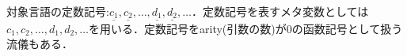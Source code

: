 \documentclass{ltjsarticle}
\theoremstyle{mystyle1}
\theoremstyle{mystyle3}
\theoremstyle{mystyle2}
\begin{document}
対象言語の定数記号:$\underline{c_1},\underline{c_2},\ldots,\underline{d_1},\underline{d_2},\ldots$．定数記号を表すメタ変数としては$c_1,c_2,\ldots,d_1,d_2,\ldots$を用いる．定数記号をarity(引数の数)が0の函数記号として扱う流儀もある．

\begin{comment}
■函数記号
2311
F: 函数記号(function symbol)の集合． arity: F → N \ {0} が定義され，引数の数を表すと する． 対象言語の函数記号:fi, f2, ... 91, 92, ... h1, h2, ...． 函数記号を表すメタ変数としては f,g,h, fi, fe, .... g1, 92, ..., h1, h2, ... を用いる． F = {f/2,g/1}などと表 記して，arity(f) = 2, arity(g) = 1を表すことに
する．
述語記号
232
P: 述語記号(predicate symbol) の集合．空でないと する．arity: P → N が定義されているとする． 対象言語の述語記号:p1,p2, ..., 41,42, ..., r1, 72, ...．述 語記号を表すメタ変数として p, g, r, ..., p1,p2, ..., 91, 92, ... を用いる．Fの場合と同 様にしてarity を表すことにする．
上記3種類の定数・函数・述語記号は，述語記号が空集 合でないという条件が付いている以外，一般には追加 条件はない．述語記号が空集合だと，後で定義する論 理式の集合が空集合となってしまうため，意味がない．
233
但し一階述語論理で取り扱える一般の数学の場合，こ れら3種類の記号は通常有限集合とする場合がほとん どである．無限集合の場合も考えるのは，そのように 一般化してもそれほど問題がないことと，理論展開上 必要な場合が出てくるのに備えてのことである．
■補助記号 (,) などの補助的に用いる記号．
■一階述語論理の言語
234
V, K, F, Pがすべて定まると一階述語論理の構成要素 の記号やそれらの列あるいは木がすべて定まるので， L = (V, K, F, P) で一階述語論理の言語を表すことに する．逆に，LのV, K, F, Pをそれぞれ VL, KL, FL, PL と書いて，言語Lの変数記号，定数記 号，函数記号，述語記号の集合を表すことにする．以 下の項，原子論理式，論理式の集合は，組 Lが定まる と決まるので，それぞれ添え字Lを付けている．
Phone
www
項
235
以下のように帰納的に定義される集合TTL の元を項 (term) という． (1) 変数記号と定数記号はTTLの元である． (2) ti, ... twをTTLの元とし, f を arity nの函数記号
とするとき，f(t1,..,tn) も TTLの元である． S, t, S1, S2, ..., t1, te, ...を項のメタ変数として用いる． 函数記号を四則演算の+や-，・のように演算子として 項を表記する場合がある．演算子の優先順位は，通常 は単項の方が他よりも優先順位が高いとする．
■原子論理式
236
t1,.., thを項とし, pを arity が n の述語記号とすると き，p(t1,..,tn)は原子論理式(atomic formula) の集 合 AALの元である． 原子論理式も，述語記号を演算子として表記する場合
がある．例えば等号=/2は二項演算子として表記する 場合が多い．
■量化子
CE VL のとき，V.cを全称量化子(universal quantifyer)，3.を存在量化子(existential quantifyer)と言い，両者を併せて量化子(quantifyer)

\end{comment}
\end{document}
